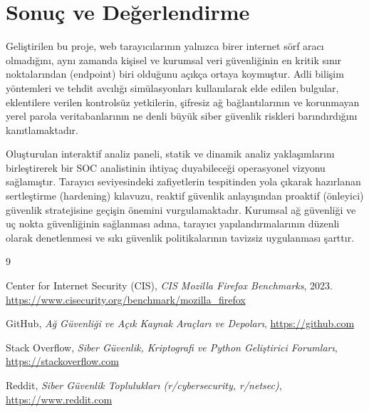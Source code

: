 \documentclass[12pt,a4paper]{article}
\begin{document}
\section{Sonuç ve Değerlendirme}

Geliştirilen bu proje, web tarayıcılarının yalnızca birer internet sörf aracı olmadığını, aynı zamanda kişisel ve kurumsal veri güvenliğinin en kritik sınır noktalarından (endpoint) biri olduğunu açıkça ortaya koymuştur. Adli bilişim yöntemleri ve tehdit avcılığı simülasyonları kullanılarak elde edilen bulgular, eklentilere verilen kontrolsüz yetkilerin, şifresiz ağ bağlantılarının ve korunmayan yerel parola veritabanlarının ne denli büyük siber güvenlik riskleri barındırdığını kanıtlamaktadır.

Oluşturulan interaktif analiz paneli, statik ve dinamik analiz yaklaşımlarını birleştirerek bir SOC analistinin ihtiyaç duyabileceği operasyonel vizyonu sağlamıştır. Tarayıcı seviyesindeki zafiyetlerin tespitinden yola çıkarak hazırlanan sertleştirme (hardening) kılavuzu, reaktif güvenlik anlayışından proaktif (önleyici) güvenlik stratejisine geçişin önemini vurgulamaktadır. Kurumsal ağ güvenliği ve uç nokta güvenliğinin sağlanması adına, tarayıcı yapılandırmalarının düzenli olarak denetlenmesi ve sıkı güvenlik politikalarının tavizsiz uygulanması şarttır.

\vspace{2cm}
\begin{thebibliography}{9}

Center for Internet Security (CIS), \textit{CIS Mozilla Firefox Benchmarks}, 2023. \url{https://www.cisecurity.org/benchmark/mozilla_firefox}

GitHub, \textit{Ağ Güvenliği ve Açık Kaynak Araçları ve Depoları}, \url{https://github.com}

Stack Overflow, \textit{Siber Güvenlik, Kriptografi ve Python Geliştirici Forumları}, \url{https://stackoverflow.com}

Reddit, \textit{Siber Güvenlik Toplulukları (r/cybersecurity, r/netsec)}, \url{https://www.reddit.com}

\end{thebibliography}
\end{document}
